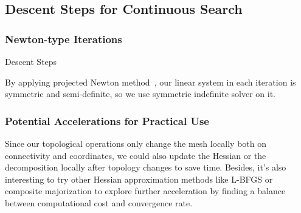 
\subsection{Descent Steps for Continuous Search}
\label{sec:descentStep}

\subsubsection{Newton-type Iterations}

\begin{algorithm}[h]
\SetAlgoLined
{}
\caption{Descent Steps}
\end{algorithm}
By applying projected Newton method~\cite{Teran2005Robust}, our linear system in each iteration is symmetric and semi-definite, so we use symmetric indefinite solver on it.


\subsubsection{Potential Accelerations for Practical Use}

Since our topological operations only change the mesh locally both on connectivity and coordinates, we could also update the Hessian or the decomposition locally after topology changes to save time. Besides, it's also interesting to try other Hessian approximation methods like L-BFGS \cite{Liu1989Limited} or composite majorization \cite{Shtengel2017Geometric} to explore further acceleration by finding a balance between computational cost and convergence rate.


